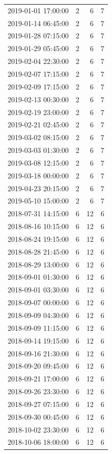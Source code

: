 \begin{tabular}{lrrr}
2019-01-01 17:00:00 & 2 & 6 & 7 \\
2019-01-14 06:45:00 & 2 & 6 & 7 \\
2019-01-28 07:15:00 & 2 & 6 & 7 \\
2019-01-29 05:45:00 & 2 & 6 & 7 \\
2019-02-04 22:30:00 & 2 & 6 & 7 \\
2019-02-07 17:15:00 & 2 & 6 & 7 \\
2019-02-09 17:15:00 & 2 & 6 & 7 \\
2019-02-13 00:30:00 & 2 & 6 & 7 \\
2019-02-19 23:00:00 & 2 & 6 & 7 \\
2019-02-21 02:45:00 & 2 & 6 & 7 \\
2019-03-02 08:15:00 & 2 & 6 & 7 \\
2019-03-03 01:30:00 & 2 & 6 & 7 \\
2019-03-08 12:15:00 & 2 & 6 & 7 \\
2019-03-18 00:00:00 & 2 & 6 & 7 \\
2019-04-23 20:15:00 & 2 & 6 & 7 \\
2019-05-10 15:00:00 & 2 & 6 & 7 \\
2018-07-31 14:15:00 & 6 & 12 & 6 \\
2018-08-16 10:15:00 & 6 & 12 & 6 \\
2018-08-24 19:15:00 & 6 & 12 & 6 \\
2018-08-28 21:45:00 & 6 & 12 & 6 \\
2018-08-29 13:00:00 & 6 & 12 & 6 \\
2018-09-01 01:30:00 & 6 & 12 & 6 \\
2018-09-01 03:30:00 & 6 & 12 & 6 \\
2018-09-07 00:00:00 & 6 & 12 & 6 \\
2018-09-09 04:30:00 & 6 & 12 & 6 \\
2018-09-09 11:15:00 & 6 & 12 & 6 \\
2018-09-14 19:15:00 & 6 & 12 & 6 \\
2018-09-16 21:30:00 & 6 & 12 & 6 \\
2018-09-20 09:45:00 & 6 & 12 & 6 \\
2018-09-21 17:00:00 & 6 & 12 & 6 \\
2018-09-26 23:30:00 & 6 & 12 & 6 \\
2018-09-27 07:15:00 & 6 & 12 & 6 \\
2018-09-30 00:45:00 & 6 & 12 & 6 \\
2018-10-02 23:30:00 & 6 & 12 & 6 \\
2018-10-06 18:00:00 & 6 & 12 & 6 \\

\end{tabular}
